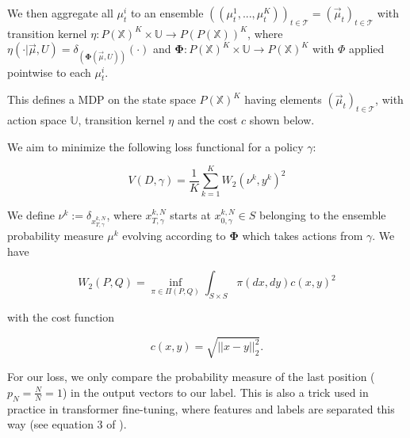 \documentclass{article}
\begin{document}



We then aggregate all $\mu^i_t$ to an ensemble $((\mu^1_t, ... , \mu^K_t))_{t \in \mathcal{T}}=(\vec \mu_t)_{t \in \mathcal{T}}$ with transition kernel $\eta : P(\mathbb{X})^K \times \mathbb U\to P(P(\mathbb{X}))^K$, where $\eta (\cdot|\vec\mu, U) = \delta _{(\bm{\Phi} (\vec \mu, U))}(\cdot)$ and $\bm{\Phi} : P(\mathbb{X})^K\times \mathbb U \to P(\mathbb{X})^K$ with $\Phi$ applied pointwise to each $\mu^i_t$. 

This defines a MDP on the state space $P(\mathbb{X})^K$ having elements $(\vec \mu_t)_{t \in \mathcal{T}}$, with action space $\mathbb U$, transition kernel $\eta$ and the cost $c$ shown below.

We aim to minimize the following loss functional for a policy $\gamma$:

$$
V(D, \gamma) =  \frac{1}{K}\sum _{k = 1}^K W_{2}(\nu^k ,y^k)^2 
$$

We define $\nu^k := \delta_{x^{k, N}_{T, \gamma}}$, where $x^{k, N}_{T, \gamma}$ starts at $x^{k, N}_{0, \gamma} \in S$ belonging to the ensemble probability measure $\mu^k$ evolving according to $\bm{\Phi}$ which takes actions from $\gamma$. We have

$$W_2(P, Q) = \inf _{\pi \in \Pi (P, Q)} \int _{S \times S} \pi(dx, dy) c(x, y)^2$$

with the cost function 

$$ c(x, y) =  \sqrt{||x-y||_2^2}.$$

For our loss, we only compare the probability measure of the last position ($p_N = \frac{N}{N} = 1$) in the output vectors to our label. This is also a trick used in practice in transformer fine-tuning, where features and labels are separated this way (see equation 3 of \cite{radford2018improving}). 
\end{document}
